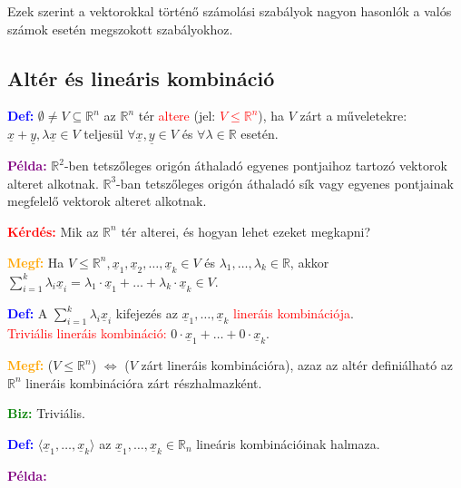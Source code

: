 \documentclass[../szamtud.tex]{subfiles}
\begin{document}
        Ezek szerint a vektorokkal történő számolási szabályok nagyon hasonlók a valós számok esetén megszokott szabályokhoz.

    \subsection{Altér és lineáris kombináció}

        \textcolor{blue}{\textbf{Def:}} $\emptyset \neq V \subseteq \mathbb{R}^n$ az $\mathbb{R}^n$ tér \textcolor{red}{altere} (jel: \textcolor{red}{$V \leq \mathbb{R}^n$}), ha $V$ zárt a műveletekre: $\underline{x} + \underline{y}, \lambda \underline{x} \in V$ teljesül $\forall \underline{x},\underline{y} \in V$ és $\forall \lambda \in \mathbb{R}$ esetén. 

        \textcolor{purple}{\textbf{Példa:}} $\mathbb{R}^2$-ben tetszőleges origón áthaladó egyenes pontjaihoz tartozó vektorok alteret alkotnak. $\mathbb{R}^3$-ban tetszőleges origón áthaladó sík vagy egyenes pontjainak megfelelő vektorok alteret alkotnak.

        \textcolor{red}{\textbf{Kérdés:}} Mik az $\mathbb{R}^n$ tér alterei, és hogyan lehet ezeket megkapni?

        \textcolor{orange}{\textbf{Megf:}} Ha $V \leq \mathbb{R}^n, \underline{x}_1, \underline{x}_2, \dots, \underline{x}_k \in V$ és $\lambda_1, \dots, \lambda_k \in \mathbb{R}$, akkor $\sum_{i=1}^{k} \lambda_i \underline{x}_i = \lambda_1\cdot \underline{x}_1 + \dots + \lambda_k \cdot \underline{x}_k \in V$.

        \textcolor{blue}{\textbf{Def:}} A $\sum_{i=1}^{k} \lambda_i\underline{x}_i$ kifejezés az $\underline{x}_1, \dots, \underline{x}_k$ \textcolor{red}{lineráis kombinációja}. \\ \textcolor{red}{Triviális lineráis kombináció:} $0 \cdot \underline{x}_1 + \dots + 0 \cdot \underline{x}_k$.

        \textcolor{orange}{\textbf{Megf:}} ($V \leq \mathbb{R}^n$) $\Longleftrightarrow$ ($V$ zárt lineráis kombinációra), azaz az altér definiálható az $\mathbb{R}^n$ lineráis kombinációra zárt részhalmazként. 

        \textcolor{green}{\textbf{Biz:}} Triviális.

        \textcolor{blue}{\textbf{Def:}} $ \langle \underline{x}_1, \dots, \underline{x}_k \rangle$ az $\underline{x}_1, \dots, \underline{x}_k \in \mathbb{R}_n$ lineáris kombinációinak halmaza.

        \textcolor{purple}{\textbf{Példa:}}
\end{document}
